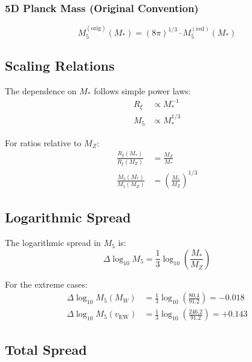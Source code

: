 \documentclass[11pt,a4paper]{article}
\newcommand{\Mfive}{M_5}
\newcommand{\Rxi}{R_\xi}
\newcommand{\MZ}{M_Z}
\newcommand{\MW}{M_W}
\newcommand{\vEW}{v_{\mathrm{EW}}}
\newcommand{\Mstar}{M_*}
\theoremstyle{definition}
\theoremstyle{plain}
\theoremstyle{remark}
\begin{document}
\subsubsection{5D Planck Mass (Original Convention)}
\begin{equation}
\boxed{\Mfive^{\mathrm{(orig)}}(\Mstar) = (8\pi)^{1/3} \cdot \Mfive^{\mathrm{(red)}}(\Mstar)}
\label{eq:M5-orig-of-Mstar}
\end{equation}

\subsection{Scaling Relations}

The dependence on $\Mstar$ follows simple power laws:
\begin{align}
\Rxi &\propto \Mstar^{-1} \label{eq:Rxi-scaling} \\
\Mfive &\propto \Mstar^{1/3} \label{eq:M5-scaling}
\end{align}

For ratios relative to $\MZ$:
\begin{align}
\frac{\Rxi(\Mstar)}{\Rxi(\MZ)} &= \frac{\MZ}{\Mstar} \label{eq:Rxi-ratio} \\
\frac{\Mfive(\Mstar)}{\Mfive(\MZ)} &= \left(\frac{\Mstar}{\MZ}\right)^{1/3} \label{eq:M5-ratio}
\end{align}

\subsection{Logarithmic Spread}

The logarithmic spread in $\Mfive$ is:
\begin{equation}
\Delta\log_{10}\Mfive = \frac{1}{3}\log_{10}\left(\frac{\Mstar}{\MZ}\right)
\label{eq:log-spread}
\end{equation}

For the extreme cases:
\begin{align}
\Delta\log_{10}\Mfive(\MW) &= \frac{1}{3}\log_{10}\left(\frac{80.4}{91.2}\right) = -0.018 \label{eq:log-MW} \\
\Delta\log_{10}\Mfive(\vEW) &= \frac{1}{3}\log_{10}\left(\frac{246.2}{91.2}\right) = +0.143 \label{eq:log-vEW}
\end{align}

\subsection{Total Spread}
\end{document}
